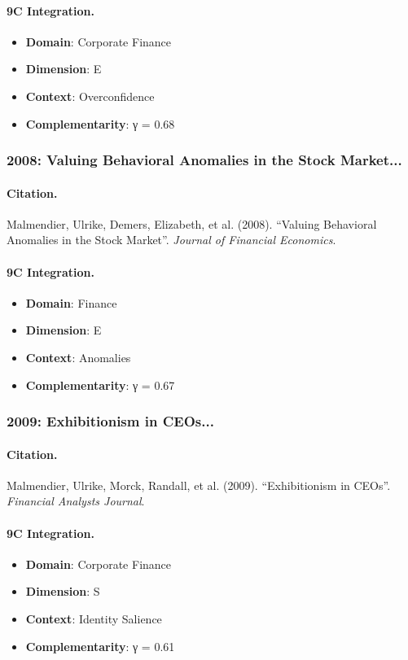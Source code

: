 \paragraph{9C Integration.}
\begin{itemize}[nosep]
  \item \textbf{Domain}: Corporate Finance
  \item \textbf{Dimension}: E
  \item \textbf{Context}: Overconfidence
  \item \textbf{Complementarity}: γ = 0.68
\end{itemize}


\subsubsection{2008: Valuing Behavioral Anomalies in the Stock Market...}

\paragraph{Citation.}
Malmendier, Ulrike, Demers, Elizabeth, et al. (2008). ``Valuing Behavioral Anomalies in the Stock Market''. \textit{Journal of Financial Economics}.

\paragraph{9C Integration.}
\begin{itemize}[nosep]
  \item \textbf{Domain}: Finance
  \item \textbf{Dimension}: E
  \item \textbf{Context}: Anomalies
  \item \textbf{Complementarity}: γ = 0.67
\end{itemize}


\subsubsection{2009: Exhibitionism in CEOs...}

\paragraph{Citation.}
Malmendier, Ulrike, Morck, Randall, et al. (2009). ``Exhibitionism in CEOs''. \textit{Financial Analysts Journal}.

\paragraph{9C Integration.}
\begin{itemize}[nosep]
  \item \textbf{Domain}: Corporate Finance
  \item \textbf{Dimension}: S
  \item \textbf{Context}: Identity Salience
  \item \textbf{Complementarity}: γ = 0.61
\end{itemize}


